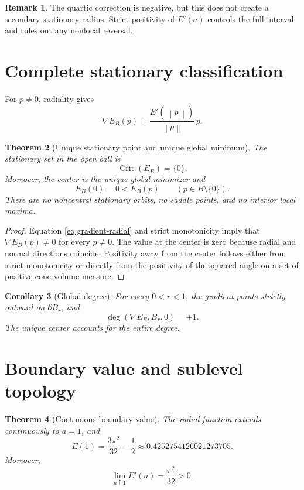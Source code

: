 \documentclass[11pt]{article}
\newtheorem{theorem}{Theorem}[section]
\newtheorem{corollary}[theorem]{Corollary}
\theoremstyle{definition}
\newtheorem{remark}[theorem]{Remark}
\newcommand{\norm}[1]{\left\lVert #1\right\rVert}
\begin{document}
\begin{remark}
The quartic correction is negative, but this does not create a secondary stationary radius.  Strict positivity of $E'(a)$ controls the full interval and rules out any nonlocal reversal.
\end{remark}

\section{Complete stationary classification}

For $p\neq0$, radiality gives
\begin{equation}
\nabla E_B(p)
=
\frac{E'(\norm p)}{\norm p}\,p.
\label{eq:gradient-radial}
\end{equation}

\begin{theorem}[Unique stationary point and unique global minimum]
The stationary set in the open ball is
\begin{equation}
\operatorname{Crit}(E_B)=\{0\}.
\label{eq:crit-set}
\end{equation}
Moreover, the center is the unique global minimizer and
\[
E_B(0)=0<E_B(p)
\qquad
(p\in B\setminus\{0\}).
\]
There are no noncentral stationary orbits, no saddle points, and no interior local maxima.
\end{theorem}

\begin{proof}
Equation \eqref{eq:gradient-radial} and strict monotonicity imply that $\nabla E_B(p)\neq0$ for every $p\neq0$.  The value at the center is zero because radial and normal directions coincide.  Positivity away from the center follows either from strict monotonicity or directly from the positivity of the squared angle on a set of positive cone-volume measure.
\end{proof}

\begin{corollary}[Global degree]
For every $0<r<1$, the gradient points strictly outward on $\partial B_r$, and
\[
\deg(\nabla E_B,B_r,0)=+1.
\]
The unique center accounts for the entire degree.
\end{corollary}

\section{Boundary value and sublevel topology}

\begin{theorem}[Continuous boundary value]
The radial function extends continuously to $a=1$, and
\begin{equation}
E(1)
=
\frac{3\pi^2}{32}-\frac12
\approx
0.4252754126021273705.
\label{eq:boundary-value}
\end{equation}
Moreover,
\begin{equation}
\lim_{a\uparrow1}E'(a)=\frac{\pi^2}{32}>0.
\label{eq:boundary-derivative}
\end{equation}
\end{theorem}
\end{document}
